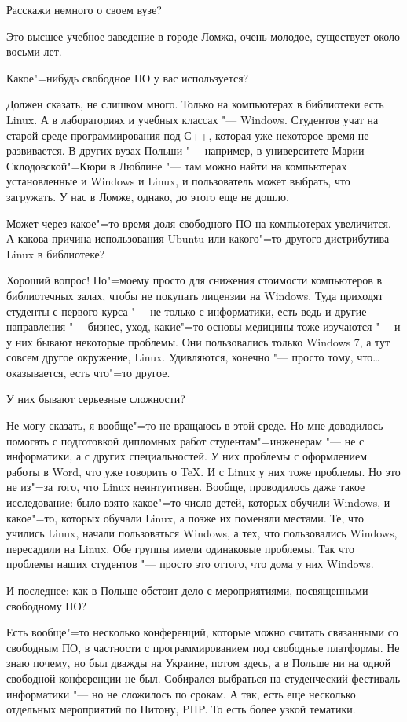 \documentclass[10pt, a5paper]{article}
\begin{document}
\q Расскажи немного о своем вузе?

\noindent Это высшее учебное заведение в городе Ломжа, очень молодое, существует около восьми лет. 

\q Какое"=нибудь свободное ПО у вас используется?

\a Должен сказать, не слишком много. Только на компьютерах в библиотеки есть Linux. А в лабораториях и учебных классах "--- Windows. Студентов учат на старой среде программирования под С++, которая уже некоторое время не развивается. В других вузах Польши "--- например, в университете Марии Склодовской"=Кюри в Люблине "--- там можно найти на компьютерах установленные и Windows и Linux, и пользователь может выбрать, что загружать. У нас в Ломже, однако, до этого еще не дошло.

\q Может через какое"=то время доля свободного ПО на компьютерах увеличится. А какова причина использования Ubuntu или какого"=то другого дистрибутива Linux в библиотеке?

\a Хороший вопрос! По"=моему просто для снижения стоимости компьютеров в библиотечных залах, чтобы не покупать лицензии на Windows. Туда приходят студенты с первого курса "--- не только с информатики, есть ведь и другие направления "--- бизнес, уход, какие"=то основы медицины тоже изучаются "--- и у них бывают некоторые проблемы. Они пользовались только Windows 7, а тут совсем другое окружение, Linux. Удивляются, конечно "--- просто тому, что\ldots оказывается, есть что"=то другое. 

\q У них бывают серьезные сложности?

\a Не могу сказать, я вообще"=то не вращаюсь в этой среде. Но мне доводилось помогать с подготовкой дипломных работ студентам"=инженерам "--- не с информатики, а с других специальностей. У них проблемы с оформлением работы в Word, что уже говорить о \TeX. И с Linux у них тоже проблемы. Но это не из"=за того, что Linux неинтуитивен. Вообще, проводилось даже такое исследование: было взято какое"=то число детей, которых обучили Windows, и какое"=то, которых обучали Linux, а позже их поменяли местами. Те, что учились Linux, начали пользоваться Windows, а тех, что пользовались Windows, пересадили на Linux. Обе группы имели одинаковые проблемы. Так что проблемы наших студентов "--- просто это оттого, что дома у них Windows. 

\q И последнее: как в Польше обстоит дело с мероприятиями, посвященными свободному ПО?

\a Есть вообще"=то несколько конференций, которые можно считать связанными со свободным ПО, в частности с программированием под свободные платформы. Не знаю почему, но был дважды на Украине, потом здесь, а в Польше ни на одной свободной конференции не был. Собирался выбраться на студенческий фестиваль информатики "--- но не сложилось по срокам. А так, есть еще несколько отдельных мероприятий по Питону, PHP. То есть более узкой тематики.
\end{document}
